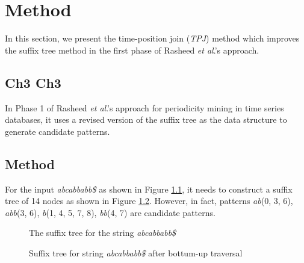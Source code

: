 %
%
%
\chapter{Method}
\vspace*{30pt} In this section, we present the time-position join
(\emph{TPJ}) method which improves the suffix tree method in the
first phase of Rasheed \emph{et al}.'s approach.

\section{Ch3 Ch3}
In Phase 1 of Rasheed \emph{et al}.'s approach for periodicity
mining in time series databases, it uses a revised version of the
suffix tree as the data structure to generate candidate patterns.

\section{Method}
For the input \emph{abcabbabb\$} as shown in Figure
\ref{licesuffixtree}, it needs to construct a suffix tree of 14
nodes as shown in Figure \ref{licesuffixtreebottumup}. However, in
fact, patterns \emph{ab}(0, 3, 6), \emph{abb}(3, 6), \emph{b}(1, 4,
5, 7, 8), \emph{bb}(4, 7) are candidate patterns.

\begin{figure}
\begin{center}
\centerline{}
\caption{The suffix tree for the string \emph{abcabbabb\$}}
\label{licesuffixtree}
\end{center}
\end{figure}

\begin{figure}
\begin{center}
\centerline{}
\caption{Suffix tree for string \emph{abcabbabb\$} after bottum-up
traversal} \label{licesuffixtreebottumup}
\end{center}
\end{figure}
